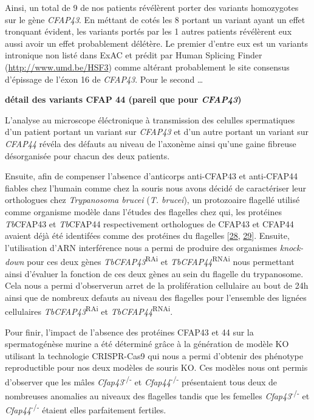 \documentclass[12pt,twoside]{reedthesis}
\theoremstyle{definition}
\theoremstyle{definition}
\theoremstyle{remark}
\begin{document}
  Ainsi, un total de 9 de nos patients révélèrent porter des variants
  homozygotes sur le gène \emph{CFAP43}. En méttant de cotés les 8 portant
  un variant ayant un effet tronquant évident, les variants portés par les
  1 autres patients révélèrent eux aussi avoir un effet probablement
  délétère. Le premier d'entre eux est un variants intronique non listé
  dans ExAC et prédit par Human Splicing Finder
  (\url{http://www.umd.be/HSF3}) comme altérant probablement le site
  consensus d'épissage de l'éxon 16 de \emph{CFAP43}. Pour le second
  \ldots{}
  
  \textbf{détail des variants CFAP 44 (pareil que pour \emph{CFAP43})}
  
  L'analyse au microscope éléctronique à transmission des celulles
  spermatiques d'un patient portant un variant sur \emph{CFAP43} et d'un
  autre portant un variant sur \emph{CFAP44} révéla des défauts au niveau
  de l'axonème ainsi qu'une gaine fibreuse désorganisée pour chacun des
  deux patients.
  
  Ensuite, afin de compenser l'absence d'anticorps anti-CFAP43 et
  anti-CFAP44 fiables chez l'humain comme chez la souris nous avons décidé
  de caractériser leur orthologues chez \emph{Trypanosoma brucei}
  (\emph{T. brucei}), un protozoaire flagellé utilisé comme organisme
  modèle dans l'études des flagelles chez qui, les protéines
  \emph{Tb}CFAP43 et \emph{Tb}CFAP44 respectivement orthologues de CFAP43
  et CFAP44 avaient déjà été identifées comme des protéines du flagelles
  {[}\protect\hyperlink{ref-Broadhead2006}{28},
  \protect\hyperlink{ref-Subota2014}{29}{]}. Ensuite, l'utilisation d'ARN
  interférence nous a permi de produire des organismes \emph{knock-down}
  pour ces deux gènes \emph{TbCFAP43}\textsuperscript{RAi} et
  \emph{TbCFAP44}\textsuperscript{RNAi} nous permettant ainsi d'évaluer la
  fonction de ces deux gènes au sein du flagelle du trypanosome. Cela nous
  a permi d'observerun arret de la prolifération cellulaire au bout de 24h
  ainsi que de nombreux defauts au niveau des flagelles pour l'ensemble
  des lignées cellulaires \emph{TbCFAP43}\textsuperscript{RAi} et
  \emph{TbCFAP44}\textsuperscript{RNAi}.
  
  Pour finir, l'impact de l'absence des protéines CFAP43 et 44 sur la
  spermatogénèse murine a été déterminé grâce à la génération de modèle KO
  utilisant la technologie CRISPR-Cas9 qui nous a permi d'obtenir des
  phénotype reproductible pour nos deux modèles de souris KO. Ces modèles
  nous ont permis d'observer que les mâles
  \emph{Cfap43}\textsuperscript{-/-} et \emph{Cfap44}\textsuperscript{-/-}
  présentaient tous deux de nombreuses anomalies au niveaux des flagelles
  tandis que les femelles \emph{Cfap43}\textsuperscript{-/-} et
  \emph{Cfap44}\textsuperscript{-/-} étaient elles parfaitement fertiles.
  
\end{document}
